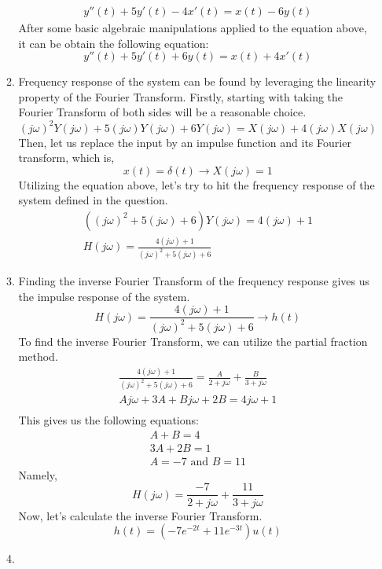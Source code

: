 \documentclass[10pt,a4paper, margin=1in]{article}
\begin{document}
\begin{enumerate}
\begin{enumerate}
\begin{align*}
                y''(t) + 5y'(t) - 4x'(t) = x(t) - 6y(t)
            \end{align*}
            After some basic algebraic manipulations applied to the equation above, it can be obtain the following equation:
            $$y''(t) + 5y'(t) + 6y(t) = x(t) + 4x'(t)$$
        \item %
        Frequency response of the system can be found by leveraging the linearity property of the Fourier Transform. Firstly, starting with taking the Fourier Transform of both sides will be a reasonable choice.
        $$(j\omega)^2Y(j\omega)+5(j\omega)Y(j\omega)+6Y(j\omega)=X(j\omega)+4(j\omega)X(j\omega)$$
        Then, let us replace the input by an impulse function and its Fourier transform, which is,
        $$x(t)=\delta(t)\rightarrow X(j\omega)=1$$
        Utilizing the equation above, let's try to hit the frequency response of the system defined in the question.
        \begin{align*}
            ((j\omega)^2+5(j\omega)+6)Y(j\omega) = 4(j\omega)+1 \\
            H(j\omega) = \frac{4(j\omega)+1}{(j\omega)^2+5(j\omega)+6}
        \end{align*}
        \item %
        Finding the inverse Fourier Transform of the frequency response gives us the impulse response of the system.
        $$ H(j\omega) = \frac{4(j\omega)+1}{(j\omega)^2+5(j\omega)+6} \rightarrow h(t)$$
	To find the inverse Fourier Transform, we can utilize the partial fraction          method.
        \begin{align*}
            \frac{4(j\omega)+1}{(j\omega)^2+5(j\omega)+6} = \frac{A}{2 + j\omega} + \frac{B}{3 + j\omega} \\
            Aj\omega + 3A + Bj\omega + 2B = 4j\omega + 1\\
        \end{align*}
        This gives us the following equations:
        \begin{align*}
            A+B=4\\
            3A+2B=1\\
            A=-7 \text{ and } B=11
        \end{align*}
        Namely,
        $$H(j\omega) = \frac{-7}{2 + j\omega} + \frac{11}{3 + j\omega}$$
        Now, let's calculate the inverse Fourier Transform.
        $$h(t)=(-7e^{-2t}+11e^{-3t})u(t)$$
        \item %

\end{enumerate}
\end{enumerate}
\end{document}
